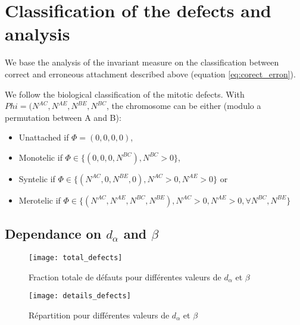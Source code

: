 \documentclass[a4paper,12pt]{article}
\begin{document}
\section{Classification of the defects and analysis}

We base the analysis of the invariant measure on the classification
between correct and erroneous attachment described above (equation
\ref{eq:corect_erron}).

We follow the biological classification of the mitotic defects. With
$Phi = (N^{AC}, N^{AE}, N^{BE}, N^{BC}$, the chromosome can be either
(modulo a permutation between A and B):
\begin{itemize}
\item Unattached if $\Phi = (0,0,0,0)$,
\item Monotelic if $\Phi \in \{(0,0,0, N^{BC}),N^{BC}> 0\}$,
\item Syntelic if $\Phi \in \{(N^{AC},0,N^{BE},0),N^{AC}> 0, N^{AE}> 0\}$ or
\item Merotelic if $\Phi \in \{(N^{AC},N^{AE},N^{BC},N^{BE}), N^{AC}>
    0, N^{AE}> 0, \forall N^{BC}, N^{BE}\}  $
\end{itemize}



\subsection{Dependance on $d_{\alpha}$ and $\beta$}

\begin{figure}[htbp]
  \centering
  \texttt{[image: total\_defects]}
  \caption{Fraction totale de défauts pour différentes valeurs de $d_{\alpha}$ et $\beta$}
  \label{fig:total}
\end{figure}

\begin{figure}[htbp]
  \centering
  \texttt{[image: details\_defects]}
  \caption{Répartition pour différentes valeurs de $d_{\alpha}$ et $\beta$}
  \label{fig:total}
\end{figure}
\end{document}
